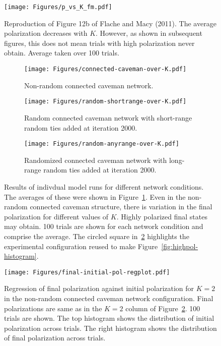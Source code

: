\begin{figure}
  \centering
    \texttt{[image: Figures/p\_vs\_K\_fm.pdf]}
  \caption{Reproduction of Figure 12b of Flache and Macy (2011). The average
    polarization decreases with $K$. However, as shown in subsequent figures,
    this does not mean trials with high polarization never obtain. Average
    taken over 100 trials.
  }
  \label{fig:p_vs_K_fm}
\end{figure}


\begin{figure}[h!]
  \centering
    \begin{subfigure}[t]{\textwidth}
      \centering
      \texttt{[image: Figures/connected-caveman-over-K.pdf]}
      \caption{Non-random connected caveman network.}
      \label{fig:connected-caveman-trials}
    \end{subfigure}
    \begin{subfigure}[t]{\textwidth}
      \centering
      \texttt{[image: Figures/random-shortrange-over-K.pdf]}
      \caption{Random connected caveman network with short-range random ties added at iteration 2000.}
      \label{fig:random-shortrange-trials}
    \end{subfigure}
    \begin{subfigure}[t]{\textwidth}
      \centering
      \texttt{[image: Figures/random-anyrange-over-K.pdf]}
      \caption{Randomized connected caveman network with long-range random ties added at iteration 2000.}
      \label{fig:random-anyrange-trials}
    \end{subfigure}
  \caption{Results of indivdual model runs for different network conditions. 
    The averages of these were shown in Figure~\ref{fig:p_vs_K_fm}.
    Even in the non-random connected caveman structure, there is 
    variation in the final polarization for different values of $K$. Highly
    polarized final states may obtain. 100 trials are shown for each 
    network condition and comprise the
    average. The circled square in~\ref{fig:connected-caveman-trials}
    highlights the experimental configuration
    reused to make Figure~\ref{fig:highpol-histogram}.
  }
  \label{fig:single-experiments-over-k}
\end{figure}


\begin{figure}[h!]
  \centering
    \texttt{[image: Figures/final-initial-pol-regplot.pdf]}
  \caption{Regression of final polarization against initial polarization 
    for $K=2$ in the non-random connected caveman network configuration.
    Final polarizations are same as in the $K=2$ column of 
    Figure~\ref{fig:connected-caveman-trials}. 100 trials are shown. The
    top histogram shows the distribution of initial polarization across
    trials. The right histogram shows the distribution of final polarization
    across trials.}
  \label{fig:final-initial-pol-regplot}
\end{figure}

